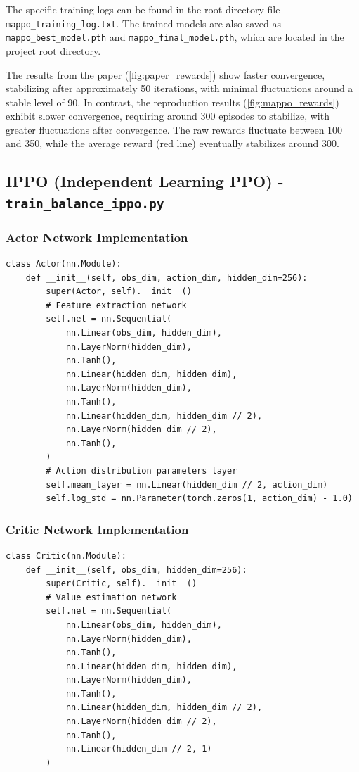 \documentclass[12pt]{article}
\begin{document}
The specific training logs can be found in the root directory file \texttt{mappo\_training\_log.txt}. The trained models are also saved as \texttt{mappo\_best\_model.pth} and \texttt{mappo\_final\_model.pth}, which are located in the project root directory.

The results from the paper (\ref{fig:paper_rewards}) show faster convergence, stabilizing after approximately 50 iterations, with minimal fluctuations around a stable level of 90. In contrast, the reproduction results (\ref{fig:mappo_rewards}) exhibit slower convergence, requiring around 300 episodes to stabilize, with greater fluctuations after convergence. The raw rewards fluctuate between 100 and 350, while the average reward (red line) eventually stabilizes around 300.

\subsection{IPPO (Independent Learning PPO) - \texttt{train\_balance\_ippo.py}} 

\subsubsection{Actor Network Implementation}

\begin{verbatim}
class Actor(nn.Module):
    def __init__(self, obs_dim, action_dim, hidden_dim=256):
        super(Actor, self).__init__()
        # Feature extraction network
        self.net = nn.Sequential(
            nn.Linear(obs_dim, hidden_dim),
            nn.LayerNorm(hidden_dim),
            nn.Tanh(),
            nn.Linear(hidden_dim, hidden_dim),
            nn.LayerNorm(hidden_dim),
            nn.Tanh(),
            nn.Linear(hidden_dim, hidden_dim // 2),
            nn.LayerNorm(hidden_dim // 2),
            nn.Tanh(),
        )
        # Action distribution parameters layer
        self.mean_layer = nn.Linear(hidden_dim // 2, action_dim)
        self.log_std = nn.Parameter(torch.zeros(1, action_dim) - 1.0)
\end{verbatim}

\subsubsection{Critic Network Implementation}

\begin{verbatim}
class Critic(nn.Module):
    def __init__(self, obs_dim, hidden_dim=256):
        super(Critic, self).__init__()
        # Value estimation network
        self.net = nn.Sequential(
            nn.Linear(obs_dim, hidden_dim),
            nn.LayerNorm(hidden_dim),
            nn.Tanh(),
            nn.Linear(hidden_dim, hidden_dim),
            nn.LayerNorm(hidden_dim),
            nn.Tanh(),
            nn.Linear(hidden_dim, hidden_dim // 2),
            nn.LayerNorm(hidden_dim // 2),
            nn.Tanh(),
            nn.Linear(hidden_dim // 2, 1)
        )
\end{verbatim}
\end{document}
